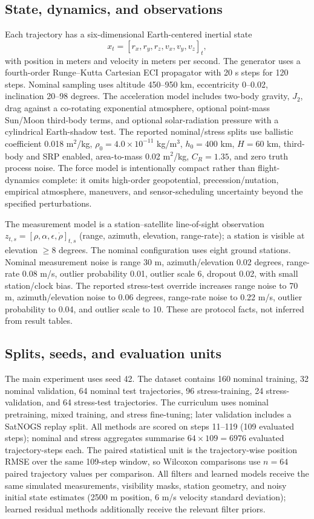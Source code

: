\documentclass{article}
\begin{document}
\subsection{State, dynamics, and observations}
Each trajectory has a six-dimensional Earth-centered inertial state
\begin{equation}
  x_t = [r_x,r_y,r_z,v_x,v_y,v_z]_t,
\end{equation}
with position in meters and velocity in meters per second. The generator uses a fourth-order Runge--Kutta Cartesian ECI propagator with 20 s steps for 120 steps. Nominal sampling uses altitude 450--950 km, eccentricity 0--0.02, inclination 20--98 degrees. The acceleration model includes two-body gravity, \(J_2\), drag against a co-rotating exponential atmosphere, optional point-mass Sun/Moon third-body terms, and optional solar-radiation pressure with a cylindrical Earth-shadow test. The reported nominal/stress splits use ballistic coefficient 0.018 m\(^2\)/kg, \(\rho_0=4.0\times10^{-11}\) kg/m\(^3\), \(h_0=400\) km, \(H=60\) km, third-body and SRP enabled, area-to-mass 0.02 m\(^2\)/kg, \(C_R=1.35\), and zero truth process noise. The force model is intentionally compact rather than flight-dynamics complete: it omits high-order geopotential, precession/nutation, empirical atmosphere, maneuvers, and sensor-scheduling uncertainty beyond the specified perturbations.

The measurement model is a station--satellite line-of-sight observation \(z_{t,s}=[\rho,\alpha,\epsilon,\dot{\rho}]_{t,s}\) (range, azimuth, elevation, range-rate); a station is visible at elevation \(\geq 8\) degrees. The nominal configuration uses eight ground stations. Nominal measurement noise is range 30 m, azimuth/elevation 0.02 degrees, range-rate 0.08 m/s, outlier probability 0.01, outlier scale 6, dropout 0.02, with small station/clock bias. The reported stress-test override increases range noise to 70 m, azimuth/elevation noise to 0.06 degrees, range-rate noise to 0.22 m/s, outlier probability to 0.04, and outlier scale to 10. These are protocol facts, not inferred from result tables.

\subsection{Splits, seeds, and evaluation units}
The main experiment uses seed 42. The dataset contains 160 nominal training, 32 nominal validation, 64 nominal test trajectories, 96 stress-training, 24 stress-validation, and 64 stress-test trajectories. The curriculum uses nominal pretraining, mixed training, and stress fine-tuning; later validation includes a SatNOGS replay split. All methods are scored on steps 11--119 (109 evaluated steps); nominal and stress aggregates summarise $64\times109=6976$ evaluated trajectory-steps each. The paired statistical unit is the trajectory-wise position RMSE over the same 109-step window, so Wilcoxon comparisons use $n=64$ paired trajectory values per comparison. All filters and learned models receive the same simulated measurements, visibility masks, station geometry, and noisy initial state estimates (2500 m position, 6 m/s velocity standard deviation); learned residual methods additionally receive the relevant filter priors.
\end{document}
